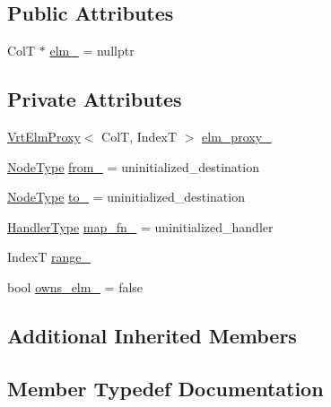 \subsection*{Public Attributes}
\begin{DoxyCompactItemize}
\item 
ColT $\ast$ \hyperlink{structvt_1_1vrt_1_1collection_1_1_migrate_msg_aa074fd362c469f1a0aae30d1cf9888bf}{elm\+\_\+} = nullptr
\end{DoxyCompactItemize}
\subsection*{Private Attributes}
\begin{DoxyCompactItemize}
\item 
\hyperlink{structvt_1_1vrt_1_1collection_1_1_vrt_elm_proxy}{Vrt\+Elm\+Proxy}$<$ ColT, IndexT $>$ \hyperlink{structvt_1_1vrt_1_1collection_1_1_migrate_msg_a1c6c855daa4709e8eecda251704e9f6e}{elm\+\_\+proxy\+\_\+}
\item 
\hyperlink{namespacevt_a866da9d0efc19c0a1ce79e9e492f47e2}{Node\+Type} \hyperlink{structvt_1_1vrt_1_1collection_1_1_migrate_msg_a1b6255e6321bcac5244caf9f01c1fb47}{from\+\_\+} = uninitialized\+\_\+destination
\item 
\hyperlink{namespacevt_a866da9d0efc19c0a1ce79e9e492f47e2}{Node\+Type} \hyperlink{structvt_1_1vrt_1_1collection_1_1_migrate_msg_a8bb8dc33230f27eef17bc2beb07ab32a}{to\+\_\+} = uninitialized\+\_\+destination
\item 
\hyperlink{namespacevt_af64846b57dfcaf104da3ef6967917573}{Handler\+Type} \hyperlink{structvt_1_1vrt_1_1collection_1_1_migrate_msg_a9ceb1e051ce61da4c6ad5689ec88935e}{map\+\_\+fn\+\_\+} = uninitialized\+\_\+handler
\item 
IndexT \hyperlink{structvt_1_1vrt_1_1collection_1_1_migrate_msg_aa5ae1696b48cdc6cfbc27cebe492b4be}{range\+\_\+}
\item 
bool \hyperlink{structvt_1_1vrt_1_1collection_1_1_migrate_msg_a76a122fa23bee165dea3d16ddae0ff48}{owns\+\_\+elm\+\_\+} = false
\end{DoxyCompactItemize}
\subsection*{Additional Inherited Members}


\subsection{Member Typedef Documentation}
\mbox{\label{structvt_1_1vrt_1_1collection_1_1_migrate_msg_a3453db7704db7db17a7afef046dba844}} 
